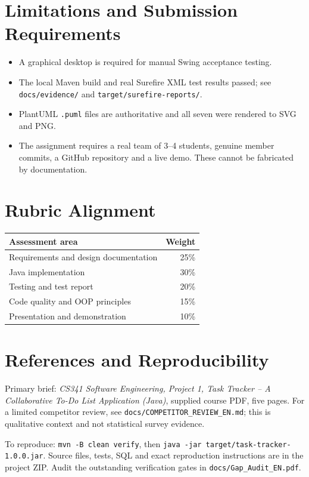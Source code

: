 \documentclass[11pt,a4paper]{article}
\begin{document}
\clearpage
\section{Limitations and Submission Requirements}
\begin{itemize}
\item A graphical desktop is required for manual Swing acceptance testing.
\item The local Maven build and real Surefire XML test results passed; see \texttt{docs/evidence/} and \texttt{target/surefire-reports/}.
\item PlantUML \texttt{.puml} files are authoritative and all seven were rendered to SVG and PNG.
\item The assignment requires a real team of 3--4 students, genuine member commits, a GitHub repository and a live demo. These cannot be fabricated by documentation.
\end{itemize}

\section{Rubric Alignment}
\begin{center}
\begin{tabular}{lr}
\toprule Assessment area & Weight \\ \midrule
Requirements and design documentation & 25\%\\
Java implementation & 30\%\\
Testing and test report & 20\%\\
Code quality and OOP principles & 15\%\\
Presentation and demonstration & 10\%\\ \bottomrule
\end{tabular}
\end{center}

\section{References and Reproducibility}
Primary brief: \textit{CS341 Software Engineering, Project 1, Task Tracker -- A Collaborative To-Do List Application (Java)}, supplied course PDF, five pages. For a limited competitor review, see \texttt{docs/COMPETITOR\_REVIEW\_EN.md}; this is qualitative context and not statistical survey evidence.

To reproduce: \texttt{mvn -B clean verify}, then \texttt{java -jar target/task-tracker-1.0.0.jar}. Source files, tests, SQL and exact reproduction instructions are in the project ZIP. Audit the outstanding verification gates in \texttt{docs/Gap\_Audit\_EN.pdf}.
\end{document}
